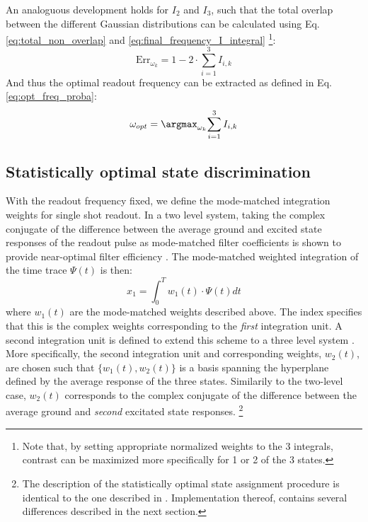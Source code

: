 An analoguous development holds for $I_2$ and $I_3$, such that the total overlap between the different Gaussian distributions can be calculated using Eq. \eqref{eq:total_non_overlap} and \eqref{eq:final_frequency_I_integral}
\footnote{Note that, by setting appropriate normalized weights to the 3 integrals, contrast can be maximized  more specifically for 1 or 2 of the 3 states.}:
\begin{equation}
   \text{Err}_{\omega_k} = 1 - 2 \cdot \sum_{i=1}^{3}{I_{i,k}} 
\end{equation}
And thus the optimal readout frequency can be extracted as defined in Eq. \eqref{eq:opt_freq_proba}:
\begin{equation} \label{eq:optimal_freq}
    \omega_{opt} = \argmax_{\omega_k} {\sum_{i=1}^{3}{I_{i,k}}}
\end{equation}


\subsection{Statistically optimal state discrimination} \label{s:statistically_optimal_state_discrimination}
With the readout frequency fixed, we define the mode-matched integration weights for single shot readout. In a two level system, taking the complex conjugate of the difference between the average ground and excited state responses of the readout pulse as mode-matched filter coefficients is shown to provide near-optimal filter efficiency \cite{Heinsoo2018, Gambetta2007, Bultink2018}. The mode-matched weighted integration of the time trace $\Psi(t)$ is then: 
\begin{equation}
    x_1 = \int_{0}^{T}{w_{1}(t)\cdot \Psi(t)dt} 
\end{equation}
where $w_{1}(t)$ are the mode-matched weights described above. The index specifies that this is the complex weights corresponding to the \textit{first} integration unit.
A second integration unit is defined to extend this scheme to a three level system \cite{Reuer2018}. More specifically, the second integration unit and corresponding weights, $w_2(t)$, are chosen such that $\{w_{1}(t), w_{2}(t)\}$ is a basis spanning the hyperplane defined by the average response of the three states. Similarily to the two-level case, $w_{2}(t)$ corresponds to the complex conjugate of the difference between the average ground and \textit{second} excitated state responses. \footnote{The description of the statistically optimal state assignment procedure is identical to the one described in \cite{Reuer2018}. Implementation thereof, contains several differences described in the next section.}


